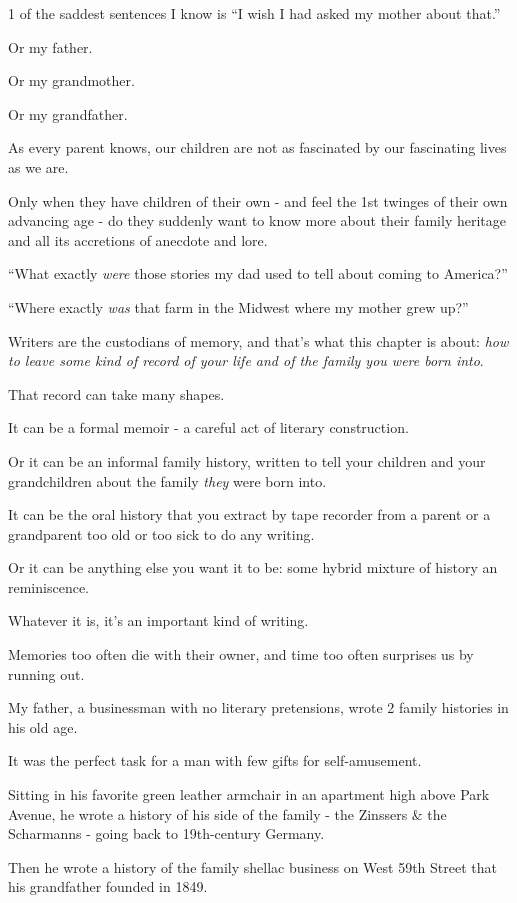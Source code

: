 \documentclass{book}
\numberwithin{equation}{section}
\begin{document}
1 of the saddest sentences I know is ``I wish I had asked my mother about that.''

Or my father.

Or my grandmother.

Or my grandfather.

As every parent knows, our children are not as fascinated by our fascinating lives as we are.

Only when they have children of their own - and feel the 1st twinges of their own advancing age - do they suddenly want to know more about their family heritage and all its accretions of anecdote and lore.

``What exactly \textit{were} those stories my dad used to tell about coming to America?''

``Where exactly \textit{was} that farm in the Midwest where my mother grew up?''

%
Writers are the custodians of memory, and that's what this chapter is about: \textit{how to leave some kind of record of your life and of the family you were born into}.

That record can take many shapes.

It can be a formal memoir - a careful act of literary construction.

Or it can be an informal family history, written to tell your children and your grandchildren about the family \textit{they} were born into.

It can be the oral history that you extract by tape recorder from a parent or a grandparent too old or too sick to do any writing.

Or it can be anything else you want it to be: some hybrid mixture of history an reminiscence.

Whatever it is, it's an important kind of writing.

Memories too often die with their owner, and time too often surprises us by running out.

%
My father, a businessman with no literary pretensions, wrote 2 family histories in his old age.

It was the perfect task for a man with few gifts for self-amusement.

Sitting in his favorite green leather armchair in an apartment high above Park Avenue, he wrote a history of his side of the family - the Zinssers \& the Scharmanns - going back to 19th-century Germany.

Then he wrote a history of the family shellac business on West 59th Street that his grandfather founded in 1849.
\end{document}
